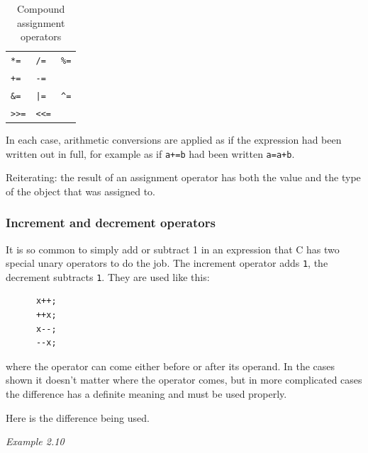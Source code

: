      \begin{table}[htb]
       \centering
       \begin{tabular}{lll}
         \toprule
         \texttt{*=}    & \texttt{/=}    & \texttt{\%=}     \\
         \texttt{+=}    & \texttt{-=}    &                  \\
         \texttt{\&=}   & \texttt{|=}    & \texttt{\^{}=}     \\
         \texttt{>{}>=} & \texttt{<{}<=} &                 \\
         \bottomrule
       \end{tabular}
       \caption{\label{tab:compoundAssign}Compound assignment operators}
     \end{table}



    In each case, arithmetic conversions are applied as if the expression
     had been written out in full, for example as if \texttt{a+=b}
     had been written \texttt{a=a+b}.


    Reiterating: the result of an assignment operator has both the value
     and the type of the object that was assigned to.


   

   \subsubsection{Increment and decrement operators}
    

    It is so common to simply add or subtract 1 in an expression that C has
     two special unary operators to do the job. The increment
     operator \pp{} adds \texttt{1}, the
     decrement \mm{} subtracts \texttt{1}. They are
     used like this:


    \begin{Verbatim}
      x++;
      ++x;
      x--;
      --x;
    \end{Verbatim}

    where the operator can come either before or after its operand. In the
     cases shown it doesn't matter where the operator comes, but in more
     complicated cases the difference has a definite meaning and must be used
     properly.


    Here is the difference being used.


    \begin{center}\textit{Example 2.10}\end{center}


